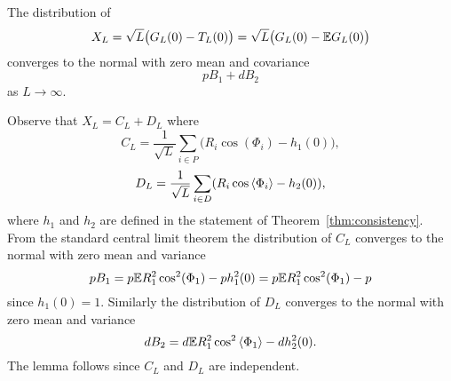 \documentclass[journal]{IEEEtran}
\begin{document}



\begin{lemma}\label{lem:XL} 
The distribution of 
\[
X_L = \sqrt{L} \big( G_L(0) - T_L(0) \big) = \sqrt{L} \big( G_L(0) - {\mathbb E} G_L(0) \big)
\] 
converges to the normal with zero mean and covariance 
\[
pB_1 + d B_2
\] 
as $L \rightarrow\infty$.
\end{lemma}
\begin{IEEEproof}
Observe that $X_L = C_L + D_L$ where
\[
C_L = \frac{1}{\sqrt{L}} \sum_{i \in P} \big( R_i \cos(\Phi_i) - h_1(0) \big),
\]
\[
D_L = \frac{1}{\sqrt{L}} \sum_{i \in D} (R_i \cos\left\langle \Phi_i \right\rangle - h_2(0) ),
\]
where $h_1$ and $h_2$ are defined in the statement of Theorem~\ref{thm:consistency}.  From the standard central limit theorem the distribution of $C_L$ converges to the normal with zero mean and variance
\[
p B_1 = p {\mathbb E} R_1^2 \cos^2(\Phi_1) - p h_1^2(0) =  p {\mathbb E} R_1^2 \cos^2(\Phi_1) - p 
\]
since $h_1(0) = 1$.  Similarly the distribution of $D_L$ converges to the normal with zero mean and variance
\[
d B_2 = d {\mathbb E} R_1^2 \cos^2\left\langle \Phi_1 \right\rangle - d h_2^2(0).
\]
The lemma follows since $C_L$ and $D_L$ are independent.
\end{IEEEproof}
\end{document}
